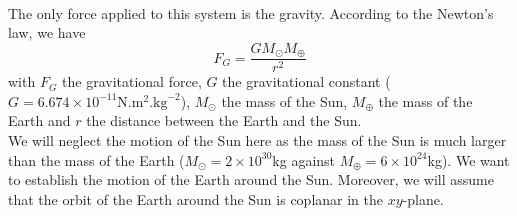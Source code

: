 \documentclass[a4paper, twoside, 11pt]{report}
\theoremstyle{theorem}
\theoremstyle{remark}
\theoremstyle{exemple}
\begin{document}
            \paragraph{}The only force applied to this system is the gravity. According to the Newton's law, we have 
                \begin{equation*}
                F_G = \frac{GM_{\odot}M_{\oplus}}{r^2}
                \end{equation*}
            with $F_G$ the gravitational force, $G$ the gravitational constant ($G=6.674 \times 10^{-11} \mathrm{N}.\mathrm{m}^2.\mathrm{kg}^{-2}$), $M_{\odot}$ the mass of the Sun, $M_{\oplus}$ the mass of the Earth and $r$ the distance between the Earth and the Sun.\\
            We will neglect the motion of the Sun here as the mass of the Sun is much larger than the mass of the Earth ($M_{\odot} = 2 \times 10^{30}$kg against $M_{\oplus} = 6 \times 10^{24}$kg). We want to establish the motion of the Earth around the Sun. Moreover, we will assume that the orbit of the Earth around the Sun is coplanar in the $xy$-plane.
\end{document}
